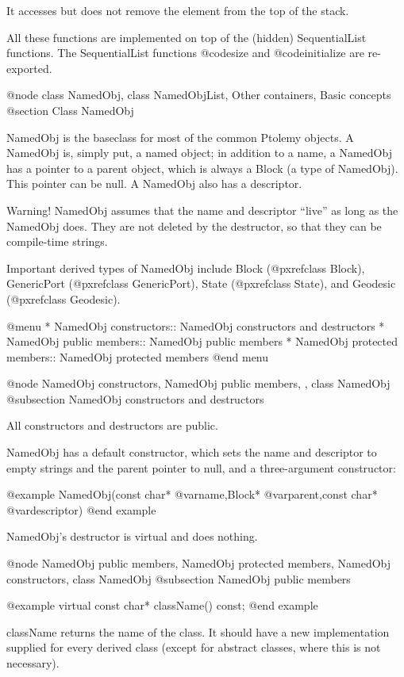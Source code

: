 It accesses but does not remove the element from the top of the stack.

All these functions are implemented on top of the (hidden)
SequentialList functions.  The SequentialList functions @code{size} and
@code{initialize} are re-exported.

@node class NamedObj, class NamedObjList, Other containers, Basic concepts
@section Class NamedObj

NamedObj is the baseclass for most of the common Ptolemy objects.  A
NamedObj is, simply put, a named object; in addition to a name, a
NamedObj has a pointer to a parent object, which is always a Block (a
type of NamedObj).  This pointer can be null.  A NamedObj also has a
descriptor.

Warning!  NamedObj assumes that the name and descriptor ``live'' as long
as the NamedObj does.  They are not deleted by the destructor, so
that they can be compile-time strings.

Important derived types of NamedObj include
Block (@pxref{class Block}),
GenericPort (@pxref{class GenericPort}),
State (@pxref{class State}), and
Geodesic (@pxref{class Geodesic}).

@menu
* NamedObj constructors::  NamedObj constructors and destructors
* NamedObj public members::  NamedObj public members
* NamedObj protected members::  NamedObj protected members
@end menu

@node NamedObj constructors, NamedObj public members,  , class NamedObj
@subsection NamedObj constructors and destructors

All constructors and destructors are public.

NamedObj has a default constructor, which sets the name and
descriptor to empty strings and the parent pointer to null, and a
three-argument constructor:

@example
NamedObj(const char* @var{name},Block* @var{parent},const char* @var{descriptor})
@end example

NamedObj's destructor is virtual and does nothing.

@node NamedObj public members, NamedObj protected members, NamedObj constructors, class NamedObj
@subsection NamedObj public members

@example
virtual const char* className() const;
@end example

className returns the name of the class.  It should have a new
implementation supplied for every derived class (except for abstract
classes, where this is not necessary).

